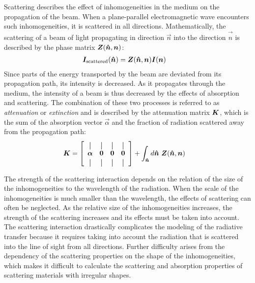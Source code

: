 Scattering describes the effect of inhomogeneities in the medium on the
propagation of the beam. When a plane-parallel electromagnetic wave encounters
such inhomogeneities, it is scattered in all directions. Mathematically, the
scattering of a beam of light propagating in direction $\vec{n}$ into the
direction $\vec{\hat{n}}$ is described by the phase matrix
$\bm{Z}(\bm{\hat{n}}, \bm{n})$:
\begin{align}
  \bm{I}_\text{scattered}(\bm{\hat{n}}) &= \bm{Z}(\bm{\hat{n}}, \bm{n}) \bm{I}(\bm{n})
\end{align}
Since parts of the energy transported by the beam are deviated from its
propagation path, its intensity is decreased. As it propagates through the
medium, the intensity of a beam is thus decreased by the effects of absorption
and scattering. The combination of these two processes is referred to
as \textit{attenuation} or \textit{extinction} and is described by the
attenuation matrix $\bm{K}$, which is the sum of the absorption vector
$\vec{\alpha}$ and the fraction of radiation scattered away from the propagation
path:
\newcommand*{\vertbar}{\rule[-1ex]{0.5pt}{2.5ex}}
\newcommand*{\horzbar}{\rule[.5ex]{2.5ex}{0.5pt}}
\begin{align}
  \vec{K} &=
  \left [ \begin{array}{cccc}
      \vertbar & \vertbar & \vertbar & \vertbar \\
      \vec{\alpha} & \vec{0} & \vec{0} & \vec{0} \\
      \vertbar & \vertbar & \vertbar & \vertbar
    \end{array} \right ]
       + \int_{\vec{\hat{n}}} d\vec{\hat{n}}\ \mat{Z}(\vec{\hat{n}}, \vec{n})
\end{align}

The strength of the scattering interaction depends on the relation of the size
of the inhomogeneities to the wavelength of the radiation. When the scale of the
inhomogeneities is much smaller than the wavelength, the effects of scattering
can often be neglected. As the relative size of the inhomogeneities increases,
the strength of the scattering increases and its effects must be taken into
account. The scattering interaction drastically complicates the modeling of the
radiative transfer because it requires taking into account the radiation that is
scattered into the line of sight from all directions. Further difficulty arises
from the dependency of the scattering properties on the shape of the
inhomogeneities, which makes it difficult to calculate the scattering
and absorption properties of scattering materials with irregular shapes.

